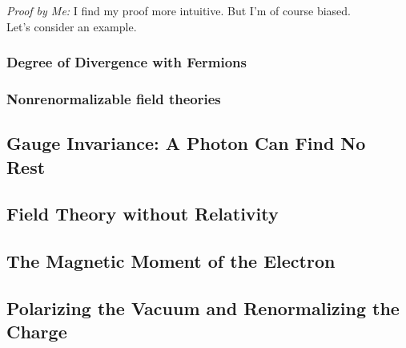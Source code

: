 \documentclass{book}
\theoremstyle{definition}
\begin{document}
\noindent \textit{Proof by Me:} I find my proof more intuitive. But I'm of course biased. \\



Let's consider an example. 



\subsubsection{Degree of Divergence with Fermions}





\subsubsection{Nonrenormalizable field theories}


















\newpage



\subsection{Gauge Invariance: A Photon Can Find No Rest}



\newpage


\subsection{Field Theory without Relativity}


\newpage


\subsection{The Magnetic Moment of the Electron}



\newpage


\subsection{Polarizing the Vacuum and Renormalizing the Charge}

\newpage
\end{document}
